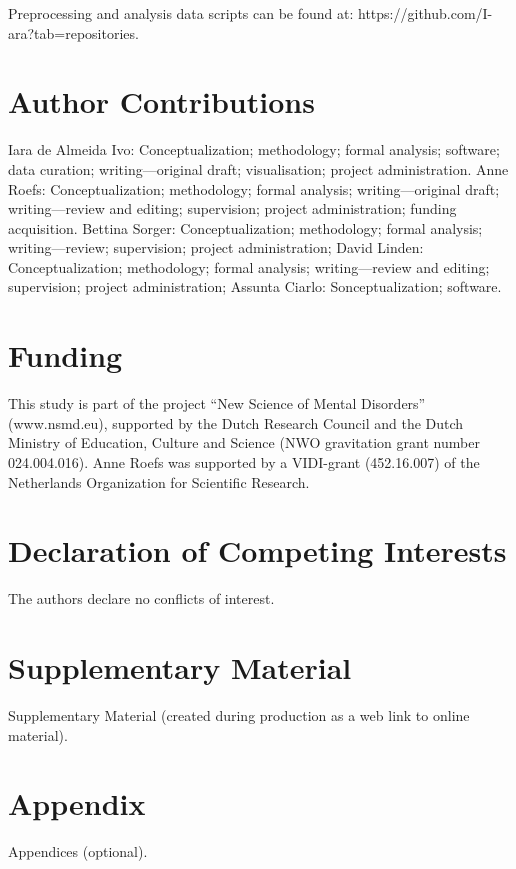 \documentclass[]{imag-ms-template}
\begin{document}
Preprocessing and analysis data scripts can be found at: https://github.com/I-ara?tab=repositories.

\section*{Author Contributions}

Iara de Almeida Ivo: Conceptualization; methodology; formal analysis; software; data curation; writing—original draft; visualisation; project administration.
Anne Roefs: Conceptualization; methodology; formal analysis; writing—original draft; writing—review and editing; supervision; project administration; funding acquisition. 
Bettina Sorger: Conceptualization; methodology; formal analysis; writing—review; supervision; project administration;
David Linden: Conceptualization; methodology; formal analysis; writing—review and editing; supervision; project administration;
Assunta Ciarlo: Sonceptualization; software.

\section*{Funding}

This study is part of the project “New Science of Mental Disorders” (www.nsmd.eu), supported by the Dutch Research Council and the Dutch Ministry of Education, Culture and Science (NWO gravitation grant number 024.004.016). Anne Roefs was supported by a VIDI-grant (452.16.007) of the Netherlands Organization for Scientific Research.

\section*{Declaration of Competing Interests}

The authors declare no conflicts of interest.

%

\section*{Supplementary Material}

Supplementary Material (created during production as a web link to online material).

\printbibliography

\appendix

\section{Appendix}

Appendices (optional).
\end{document}
